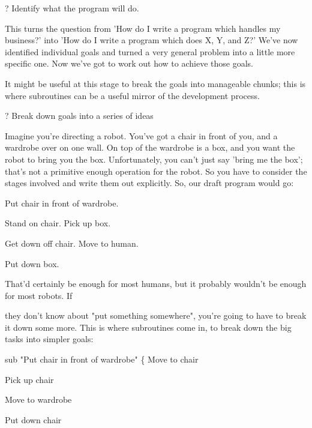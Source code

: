 \documentclass[a4paper,11pt]{book}
\begin{document}
\noindent 

\noindent ? Identify what the program will do.

\noindent 

\noindent This turns the question from 'How do I write a program which handles my business?' into 'How do I write a program which does X, Y, and Z?' We've now identified individual goals and turned a very general problem into a little more specific one. Now we've got to work out how to achieve those goals.

\noindent It might be useful at this stage to break the goals into manageable chunks; this is where subroutines can be a useful mirror of the development process.

\noindent 

\noindent ? Break down goals into a series of ideas

\noindent 

\noindent Imagine you're directing a robot. You've got a chair in front of you, and a wardrobe over on one wall. On  top of the wardrobe  is a box,  and  you  want  the  robot  to  bring  you  the box.  Unfortunately,  you can't just say 'bring me the box'; that's not a primitive enough operation for the robot. So you have to consider the stages involved and write them out explicitly. So, our draft program would go:

\noindent 

\noindent 

\noindent Put chair in front of wardrobe.

\noindent Stand on chair. Pick up box.

\noindent Get down off chair. Move to human.

\noindent Put down box.

\noindent 

\noindent That'd certainly be enough for most humans, but it probably wouldn't be enough for most robots. If

\noindent they don't know about "put something somewhere", you're going to have to break it down some more. This is where subroutines come in, to break down the big tasks into simpler goals:

\noindent 

\noindent sub "Put chair in front of wardrobe" \{ Move to chair

\noindent Pick up chair

\noindent Move to wardrobe

\noindent Put down chair
\end{document}
